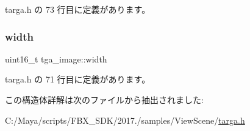  targa.\+h の 73 行目に定義があります。

\mbox{\label{structtga__image_acf9bd19c10794f18f60a001faef58111}} 
\subsubsection{\texorpdfstring{width}{width}}
{\footnotesize\ttfamily uint16\+\_\+t tga\+\_\+image\+::width}



 targa.\+h の 71 行目に定義があります。



この構造体詳解は次のファイルから抽出されました\+:\begin{DoxyCompactItemize}
\item 
C\+:/\+Maya/scripts/\+F\+B\+X\+\_\+\+S\+D\+K/2017./samples/\+View\+Scene/\hyperlink{targa_8h}{targa.\+h}\end{DoxyCompactItemize}
